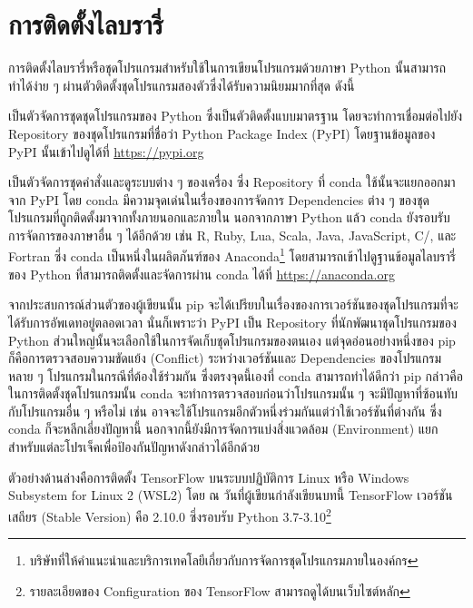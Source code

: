 \section{การติดตั้งไลบรารี่}
\label{sec:install_lib_dl}

การติดตั้งไลบรารี่หรือชุดโปรแกรมสำหรับใช้ในการเขียนโปรแกรมด้วยภาษา Python นั้นสามารถทำได้ง่าย ๆ ผ่านตัวติดตั้งชุดโปรแกรมสองตัวซึ่งได้รับความนิยมมากที่สุด ดังนี้
%
\begin{description}[topsep=0pt,noitemsep]\setlength\itemsep{0.5em}
    \item[pip] เป็นตัวจัดการชุดชุดโปรแกรมของ Python ซึ่งเป็นตัวติดตั้งแบบมาตรฐาน โดยจะทำการเชื่อมต่อไปยัง Repository ของชุดโปรแกรมที่ชื่อว่า Python Package Index (PyPI) โดยฐานข้อมูลของ PyPI นั้นเข้าไปดูได้ที่ \url{https://pypi.org}
    
    \item[conda] เป็นตัวจัดการชุดคำสั่งและดูระบบต่าง ๆ ของเครื่อง ซึ่ง Repository ที่ conda ใช้นั้นจะแยกออกมาจาก PyPI โดย conda มีความจุดเด่นในเรื่องของการจัดการ Dependencies ต่าง ๆ ของชุดโปรแกรมที่ถูกติดตั้งมาจากทั้งภายนอกและภายใน นอกจากภาษา Python แล้ว conda ยังรอบรับการจัดการของภาษาอื่น ๆ ได้อีกด้วย เช่น R, Ruby, Lua, Scala, Java, JavaScript, C/\cpp, และ Fortran ซึ่ง conda เป็นหนึ่งในผลิตภันฑ์ของ Anaconda\footnote{บริษัทที่ให้คำแนะนำและบริการเทคโลยีเกี่ยวกับการจัดการชุดโปรแกรมภายในองค์กร} โดยสามารถเข้าไปดูฐานข้อมูลไลบรารี่ของ Python ที่สามารถติดตั้งและจัดการผ่าน conda ได้ที่ \url{https://anaconda.org}
\end{description}

จากประสบการณ์ส่วนตัวของผู้เขียนนั้น pip จะได้เปรียบในเรื่องของการเวอร์ชันของชุดโปรแกรมที่จะได้รับการอัพเดทอยู่ตลอดเวลา นั่นก็เพราะว่า PyPI เป็น Repository ที่นักพัฒนาชุดโปรแกรมของ Python ส่วนใหญ่นั้นจะเลือกใช้ในการจัดเก็บชุดโปรแกรมของตนเอง แต่จุดอ่อนอย่างหนึ่งของ pip ก็คือการตรวจสอบความขัดแย้ง (Conflict) ระหว่างเวอร์ชันและ Dependencies ของโปรแกรมหลาย ๆ โปรแกรมในกรณีที่ต้องใช้ร่วมกัน ซึ่งตรงจุดนี้เองที่ conda สามารถทำได้ดีกว่า pip กล่าวคือ ในการติดตั้งชุดโปรแกรมนั้น conda จะทำการตรวจสอบก่อนว่าโปรแกรมนั้น ๆ จะมีปัญหาที่ซ้อนทับกับโปรแกรมอื่น ๆ หรือไม่ เช่น อาจจะใช้โปรแกรมอีกตัวหนึ่งร่วมกันแต่ว่าใช้เวอร์ชันที่ต่างกัน ซึ่ง conda ก็จะหลีกเลี่ยงปัญหานี้ นอกจากนี้ยังมีการจัดการแบ่งสิ่งแวดล้อม (Environment) แยกสำหรับแต่ละโปรเจ็คเพื่อป้องกันปัญหาดังกล่าวได้อีกด้วย

ตัวอย่างด้านล่างคือการติดตั้ง TensorFlow บนระบบปฏิบัติการ Linux หรือ Windows Subsystem for Linux 2 (WSL2) โดย ณ วันที่ผู้เขียนกำลังเขียนบทนี้ TensorFlow เวอร์ชันเสถียร (Stable Version) คือ 2.10.0 ซึ่งรอบรับ Python 3.7-3.10\footnote{รายละเอียดของ Configuration ของ TensorFlow สามารถดูได้บนเว็บไซต์หลัก}

